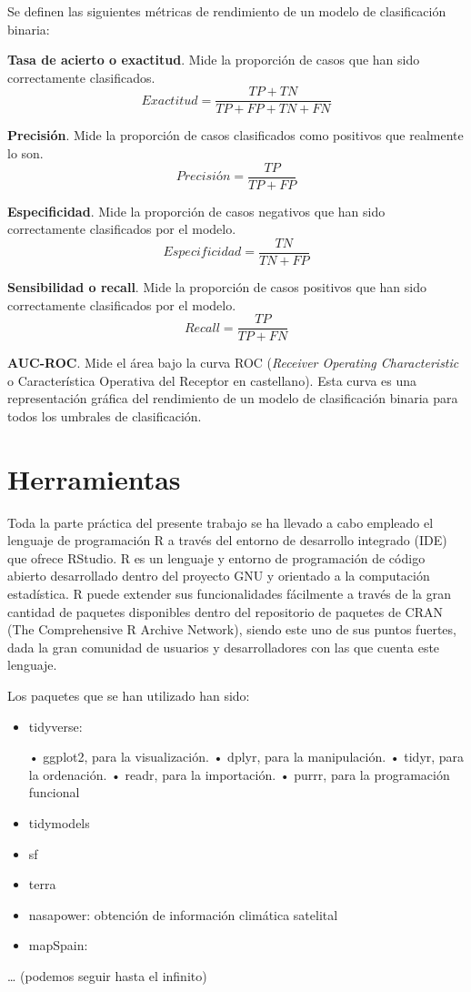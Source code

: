 \documentclass[12pt,a4paper,]{book}
\numberwithin{dummy}{section}
\theoremstyle{ocrenumbox}
\theoremstyle{blacknumex}
\theoremstyle{blacknumbox}
\theoremstyle{ocrenum}
\theoremstyle{ocrenum}
\begin{document}
Se definen las siguientes métricas de rendimiento de un modelo de
clasificación binaria:

\textbf{Tasa de acierto o exactitud}. Mide la proporción de casos que
han sido correctamente clasificados.
\[Exactitud = \frac{TP + TN}{TP + FP + TN + FN}\]

\textbf{Precisión}. Mide la proporción de casos clasificados como
positivos que realmente lo son. \[ Precisión = \frac{TP}{TP + FP}\]

\textbf{Especificidad}. Mide la proporción de casos negativos que han
sido correctamente clasificados por el modelo.
\[ Especificidad = \frac{TN}{TN + FP}\]

\textbf{Sensibilidad o recall}. Mide la proporción de casos positivos
que han sido correctamente clasificados por el modelo.
\[ Recall = \frac{TP}{TP + FN}\]

\textbf{AUC-ROC}. Mide el área bajo la curva ROC (\emph{Receiver
Operating Characteristic} o Característica Operativa del Receptor en
castellano). Esta curva es una representación gráfica del rendimiento de
un modelo de clasificación binaria para todos los umbrales de
clasificación.

\hypertarget{herramientas}{%
\section{Herramientas}\label{herramientas}}

Toda la parte práctica del presente trabajo se ha llevado a cabo
empleado el lenguaje de programación R a través del entorno de
desarrollo integrado (IDE) que ofrece RStudio. R es un lenguaje y
entorno de programación de código abierto desarrollado dentro del
proyecto GNU y orientado a la computación estadística. R puede extender
sus funcionalidades fácilmente a través de la gran cantidad de paquetes
disponibles dentro del repositorio de paquetes de CRAN (The
Comprehensive R Archive Network), siendo este uno de sus puntos fuertes,
dada la gran comunidad de usuarios y desarrolladores con las que cuenta
este lenguaje.

Los paquetes que se han utilizado han sido:

\begin{itemize}
\item
  tidyverse:

  • ggplot2, para la visualización. • dplyr, para la manipulación. •
  tidyr, para la ordenación. • readr, para la importación. • purrr, para
  la programación funcional
\item
  tidymodels
\item
  sf
\item
  terra
\item
  nasapower: obtención de información climática satelital
\item
  mapSpain:
\end{itemize}

\ldots{} (podemos seguir hasta el infinito)




%
\end{document}
